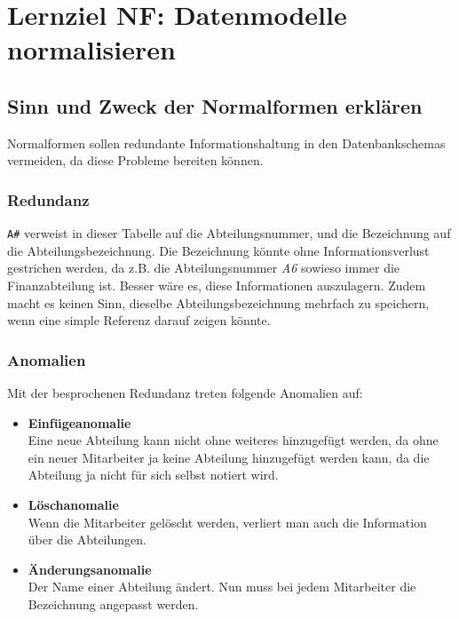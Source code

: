 \section{Lernziel NF: Datenmodelle normalisieren}

\subsection{Sinn und Zweck der Normalformen erklären}
Normalformen sollen redundante Informationshaltung in den Datenbankschemas vermeiden, da diese Probleme bereiten können.

\subsubsection{Redundanz}


\texttt{A\#} verweist in dieser Tabelle auf die Abteilungsnummer, und die Bezeichnung auf die Abteilungsbezeichnung. Die Bezeichnung könnte ohne Informationsverlust gestrichen werden, da z.B. die Abteilungsnummer \textit{A6} sowieso immer die Finanzabteilung ist. Besser wäre es, diese Informationen auszulagern. Zudem macht es keinen Sinn, dieselbe Abteilungsbezeichnung mehrfach zu speichern, wenn eine simple Referenz darauf zeigen könnte.

\subsubsection{Anomalien}
Mit der besprochenen Redundanz treten folgende Anomalien auf:

\begin{itemize}
  \item \textbf{Einfügeanomalie} \\
  Eine neue Abteilung kann nicht ohne weiteres hinzugefügt werden, da ohne ein neuer Mitarbeiter ja keine Abteilung hinzugefügt werden kann, da die Abteilung ja nicht für sich selbst notiert wird.
  \item \textbf{Löschanomalie} \\
  Wenn die Mitarbeiter gelöscht werden, verliert man auch die Information über die Abteilungen.
  \item \textbf{Änderungsanomalie} \\
  Der Name einer Abteilung ändert. Nun muss bei jedem Mitarbeiter die Bezeichnung angepasst werden.
\end{itemize}

